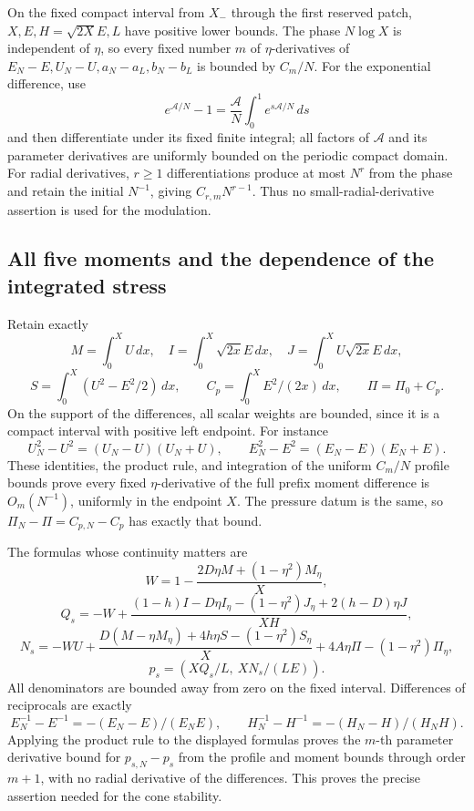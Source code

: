 \documentclass[10pt,a4paper]{article}
\begin{document}
On the fixed compact interval from \(X_-\) through the first reserved patch, \(X,E,H=\sqrt{2X}E,L\) have positive lower bounds. The phase \(N\log X\) is independent of \(\eta\), so every fixed number \(m\) of \(\eta\)-derivatives of \(E_N-E,U_N-U,a_N-a_L,b_N-b_L\) is bounded by \(C_m/N\). For the exponential difference, use \[
e^{\mathcal A/N}-1
=\frac{\mathcal A}N\int_0^1e^{s\mathcal A/N}\,ds
\] and then differentiate under its fixed finite integral; all factors of \(\mathcal A\) and its parameter derivatives are uniformly bounded on the periodic compact domain. For radial derivatives, \(r\ge1\) differentiations produce at most \(N^r\) from the phase and retain the initial \(N^{-1}\), giving \(C_{r,m}N^{r-1}\). Thus no small-radial-derivative assertion is used for the modulation.

\subsection{All five moments and the dependence of the integrated stress}\label{all-five-moments-and-the-dependence-of-the-integrated-stress}

Retain exactly \[
M=\int_0^XU\,dx,\quad I=\int_0^X\sqrt{2x}E\,dx,\quad
J=\int_0^XU\sqrt{2x}E\,dx,
\] \[
S=\int_0^X(U^2-E^2/2)\,dx,\qquad
C_p=\int_0^X E^2/(2x)\,dx,\qquad \Pi=\Pi_0+C_p.
\] On the support of the differences, all scalar weights are bounded, since it is a compact interval with positive left endpoint. For instance \[
U_N^2-U^2=(U_N-U)(U_N+U),\qquad
E_N^2-E^2=(E_N-E)(E_N+E).
\] These identities, the product rule, and integration of the uniform \(C_m/N\) profile bounds prove every fixed \(\eta\)-derivative of the full prefix moment difference is \(O_m(N^{-1})\), uniformly in the endpoint \(X\). The pressure datum is the same, so \(\Pi_N-\Pi=C_{p,N}-C_p\) has exactly that bound.

The formulas whose continuity matters are \[
W=1-\frac{2D\eta M+(1-\eta^2)M_\eta}{X},
\] \[
Q_s=-W+
\frac{(1-h)I-D\eta I_\eta-(1-\eta^2)J_\eta+2(h-D)\eta J}{XH},
\] \[
N_s=-WU+
\frac{D(M-\eta M_\eta)+4h\eta S-(1-\eta^2)S_\eta}{X}
+4A\eta\Pi-(1-\eta^2)\Pi_\eta,
\] \[
p_s=(XQ_s/L,\ XN_s/(LE)).
\] All denominators are bounded away from zero on the fixed interval. Differences of reciprocals are exactly \[
E_N^{-1}-E^{-1}=-(E_N-E)/(E_NE),\qquad
H_N^{-1}-H^{-1}=-(H_N-H)/(H_NH).
\] Applying the product rule to the displayed formulas proves the \(m\)-th parameter derivative bound for \(p_{s,N}-p_s\) from the profile and moment bounds through order \(m+1\), with no radial derivative of the differences. This proves the precise assertion needed for the cone stability.
\end{document}
